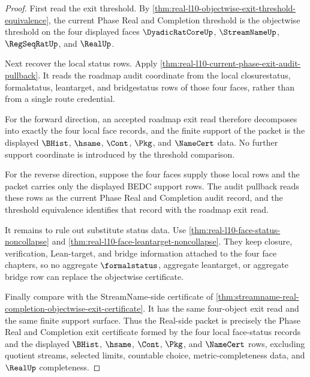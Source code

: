 \begin{proof}
First read the exit threshold. By \autoref{thm:real-l10-objectwise-exit-threshold-equivalence}, the current Phase Real and Completion threshold is the objectwise threshold on the four displayed faces $\DyadicRatCoreUp$, $\StreamNameUp$, $\RegSeqRatUp$, and $\RealUp$.

Next recover the local status rows. Apply \autoref{thm:real-l10-current-phase-exit-audit-pullback}. It reads the roadmap audit coordinate from the local closurestatus, formalstatus, leantarget, and bridgestatus rows of those four faces, rather than from a single route credential.

For the forward direction, an accepted roadmap exit read therefore decomposes into exactly the four local face records, and the finite support of the packet is the displayed $\BHist$, $\hsame$, $\Cont$, $\Pkg$, and $\NameCert$ data. No further support coordinate is introduced by the threshold comparison.

For the reverse direction, suppose the four faces supply those local rows and the packet carries only the displayed BEDC support rows. The audit pullback reads these rows as the current Phase Real and Completion audit record, and the threshold equivalence identifies that record with the roadmap exit read.

It remains to rule out substitute status data. Use \autoref{thm:real-l10-face-status-noncollapse} and \autoref{thm:real-l10-face-leantarget-noncollapse}. They keep closure, verification, Lean-target, and bridge information attached to the four face chapters, so no aggregate $\formalstatus$, aggregate leantarget, or aggregate bridge row can replace the objectwise certificate.

Finally compare with the StreamName-side certificate of \autoref{thm:streamname-real-completion-objectwise-exit-certificate}. It has the same four-object exit read and the same finite support surface. Thus the Real-side packet is precisely the Phase Real and Completion exit certificate formed by the four local face-status records and the displayed $\BHist$, $\hsame$, $\Cont$, $\Pkg$, and $\NameCert$ rows, excluding quotient streams, selected limits, countable choice, metric-completeness data, and $\RealUp$ completeness.
\end{proof}

